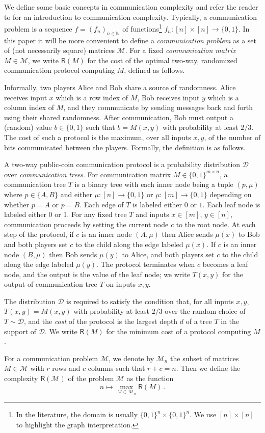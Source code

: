 \documentclass{article}
\newcommand{\zo}{\{0,1\}}
\newcommand{\cD}{\ensuremath{\mathcal{D}}}
\newcommand{\cM}{\ensuremath{\mathcal{M}}}
\newcommand{\bN}{\ensuremath{\mathbb{N}}}
\newcommand{\CC}{\mathsf{R}}
\begin{document}
We define some basic concepts in communication complexity and refer the reader to \cite{NK96,RY20}
for an introduction to communication complexity. Typically, a communication problem is a sequence $f =
(f_n)_{n \in \bN}$ of functions\footnote{In the literature, the domain is usually $\zo^n \times
\zo^n$. We use $[n] \times [n]$ to highlight the graph interpretation.} $f_n : [n] \times [n] \to
\zo$. In this paper it will be more convenient to define a \emph{communication problem} as a set of
(not necessarily square) matrices $\cM$. For a fixed \emph{communication matrix} $M \in \cM$, we
write $\CC(M)$ for the cost of the optimal two-way, randomized communication protocol computing $M$,
defined as follows.

Informally, two players Alice and Bob share a source of randomness. Alice receives input $x$ which
is a row index of $M$, Bob receives input $y$ which is a column index of $M$, and they communicate by sending
messages back and forth using their shared randomness. After communication, Bob must output a
(random) value $b \in \zo$ such that $b = M(x,y)$ with probability at least $2/3$. The cost of
such a protocol is the maximum, over all inputs $x, y$, of the number of bits communicated between the
players. Formally, the definition is as follows.

\begin{definition}
\label{def:communication protocol}
A two-way public-coin communication protocol is a probability distribution $\cD$ over
\emph{communication trees}.  For communication matrix $M \in \zo^{m \times n}$, a communication tree
$T$ is a binary tree with each inner node being a tuple $(p,\mu)$ where $p \in \{A,B\}$ and either
$\mu : [n] \to \zo$ or $\mu : [m] \to \zo$ depending on whether $p = A$ or $p = B$. Each edge of $T$
is labeled either $0$ or $1$. Each leaf node is labeled either 0 or 1. For any fixed tree $T$ and
inputs $x \in [m]$, $y \in [n]$, communication proceeds by setting the current node $c$ to the root
node.  At each step of the protocol, if $c$ is an inner node $(A,\mu)$ then Alice sends $\mu(x)$ to
Bob and both players set $c$ to the child along the edge labeled $\mu(x)$. If $c$ is an inner node
$(B,\mu)$ then Bob sends $\mu(y)$ to Alice, and both players set $c$ to the child along the edge
labeled $\mu(y)$.  The protocol terminates when $c$ becomes a leaf node, and the output is the value
of the leaf node; we write $T(x,y)$ for the output of communication tree $T$ on inputs $x,y$.

The distribution $\cD$ is required to satisfy the condition that, for all inputs $x,y$, $T(x,y) = M(x,y)$ with probability
at least $2/3$ over the random choice of $T \sim \cD$, and the \emph{cost} of the protocol is the
largest depth $d$ of a tree $T$ in the support of $\cD$. We write $\CC(M)$ for the minimum cost of a
protocol computing $M$.

For a communication problem $\cM$, we denote by $\cM_n$ the subset of matrices $M \in
\cM$ with $r$ rows and $c$ columns such that $r + c = n$. Then we define the complexity
$\CC(\cM)$ of the problem $\cM$ as the function
\[
  n \mapsto \max_{M \in \cM_n} \CC(M) \,.
\]
\end{definition}
\end{document}
